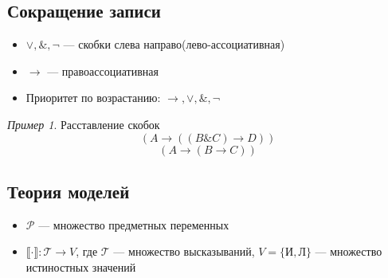 \documentclass[english]{article}
\newcommand{\llb}{\llbracket}
\newcommand{\rrb}{\rrbracket}
\theoremstyle{plain}
\theoremstyle{remark}
\newtheorem*{examp}{Пример}
\theoremstyle{definition}
\begin{document}
\subsection{Сокращение записи}
\label{sec:orga2dd0ad}
\begin{itemize}
\item \(\vee, \&, \neg\) --- скобки слева направо(лево-ассоциативная)
\item \(\to\) --- правоассоциативная
\item Приоритет по возрастанию: \(\to, \vee, \&, \neg\)
\end{itemize}
\begin{examp}
Расставление скобок
\[ \left(A \to \left( \left(B \& C\right) \to D\right)\right) \]
\[ \left(A \to \left(B \to C\right)\right) \]
\end{examp}
\subsection{Теория моделей}
\label{sec:org1b1e033}
\begin{itemize}
\item \(\mathcal{P}\) --- множество предметных переменных
\item \(\llb\cdot\rrb: \mathcal{T} \to V\), где \(\mathcal{T}\) --- множество высказываний, \(V = \{\text{И}, \text{Л}\}\) --- множество истиностных значений
\end{itemize}
\end{document}
